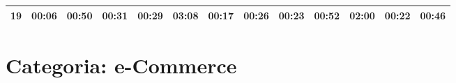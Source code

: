 \begin{center}
\begin{sideways}
\begin{tabular}{|l|l|l|l|l|l|l|l|l|l|l|l|l|}
\hline
\multicolumn{1}{|c|}{19} & \multicolumn{1}{c|}{00:06} & \multicolumn{1}{c|}{00:50} & \multicolumn{1}{c|}{00:31} & \multicolumn{1}{c|}{00:29} & \multicolumn{1}{c|}{03:08} & \multicolumn{1}{c|}{00:17} & \multicolumn{1}{c|}{00:26} & \multicolumn{1}{c|}{00:23} & \multicolumn{1}{c|}{00:52} & \multicolumn{1}{c|}{02:00} & \multicolumn{1}{c|}{00:22} & \multicolumn{1}{c|}{00:46} \\ 
\hline
\end{tabular}
\end{sideways}
\end{center}
\normalsize

\section{Categoria: e-Commerce}

